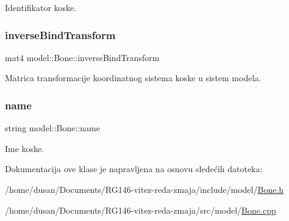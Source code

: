 Identifikator koske. 

\mbox{\label{classmodel_1_1Bone_a4e3fe672d5a018cf9755a344c9f193ab}} 
\subsubsection{\texorpdfstring{inverse\+Bind\+Transform}{inverseBindTransform}}
{\footnotesize\ttfamily mat4 model\+::\+Bone\+::inverse\+Bind\+Transform\hspace{0.3cm}{\ttfamily [private]}}



Matrica transformacije koordinatnog sistema koske u sistem modela. 

\mbox{\label{classmodel_1_1Bone_ad1613b072247f5310db1ad9ec9182956}} 
\subsubsection{\texorpdfstring{name}{name}}
{\footnotesize\ttfamily string model\+::\+Bone\+::name\hspace{0.3cm}{\ttfamily [private]}}



Ime koske. 



Dokumentacija ove klase je napravljena na osnovu sledećih datoteka\+:\begin{DoxyCompactItemize}
\item 
/home/dusan/\+Documents/\+R\+G146-\/vitez-\/reda-\/zmaja/include/model/\hyperlink{Bone_8h}{Bone.\+h}\item 
/home/dusan/\+Documents/\+R\+G146-\/vitez-\/reda-\/zmaja/src/model/\hyperlink{Bone_8cpp}{Bone.\+cpp}\end{DoxyCompactItemize}
